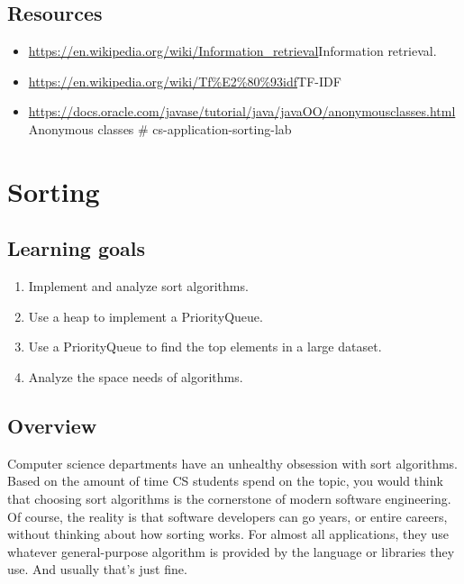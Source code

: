 \documentclass[12pt]{book}
\theoremstyle{exercise}
\begin{document}
{\section{Resources}\label{resources-15}

\begin{itemize}
\item
  \url{https://en.wikipedia.org/wiki/Information_retrieval}{Information
  retrieval}.
\item
  \url{https://en.wikipedia.org/wiki/Tf\%E2\%80\%93idf}{TF-IDF}
\item
  \url{https://docs.oracle.com/javase/tutorial/java/javaOO/anonymousclasses.html}{Anonymous
  classes} \# cs-application-sorting-lab
\end{itemize}


\chapter{Sorting}

\section{Learning goals}\label{learning-goals-11}

\begin{enumerate}
\def\labelenumi{\arabic{enumi}.}
\itemsep1pt\parskip0pt
\item
  Implement and analyze sort algorithms.
\item
  Use a heap to implement a PriorityQueue.
\item
  Use a PriorityQueue to find the top elements in a large dataset.
\item
  Analyze the space needs of algorithms.
\end{enumerate}

\section{Overview}\label{overview-19}

Computer science departments have an unhealthy obsession with sort
algorithms. Based on the amount of time CS students spend on the topic,
you would think that choosing sort algorithms is the cornerstone of
modern software engineering. Of course, the reality is that software
developers can go years, or entire careers, without thinking about how
sorting works. For almost all applications, they use whatever
general-purpose algorithm is provided by the language or libraries they
use. And usually that's just fine.

}
\end{document}
